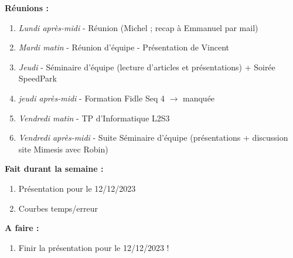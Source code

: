\textbf{Réunions :}
\begin{enumerate}[label=\textbullet]
	\item \textit{Lundi après-midi} - Réunion (Michel ; recap à Emmanuel par mail)
	\item \textit{Mardi matin} - Réunion d'équipe - Présentation de Vincent
	\item \textit{Jeudi} - Séminaire d'équipe (lecture d'articles et présentations) + Soirée SpeedPark
	\item \textit{jeudi après-midi} - Formation Fidle Seq 4 $\rightarrow$ manquée
	\item \textit{Vendredi matin} - TP d'Informatique L2S3
	\item \textit{Vendredi après-midi} - Suite Séminaire d'équipe (présentations + discussion site Mimesis avec Robin)
\end{enumerate}
\textbf{Fait durant la semaine :}
\begin{enumerate}[label=\textbullet]
	\item Présentation pour le 12/12/2023
	\item Courbes temps/erreur
\end{enumerate}
\textbf{A faire :}
\begin{enumerate}[label=\textbullet]
	\item Finir la présentation pour le 12/12/2023 !
\end{enumerate}